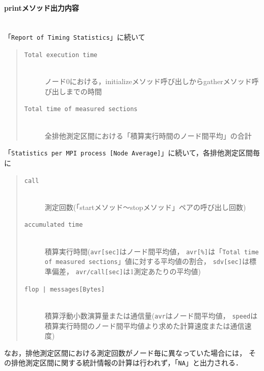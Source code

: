 \paragraph{printメソッド出力内容}\mbox{}\\
「{\tt Report of Timing Statistics}」に続いて
\begin{quote}
\begin{description}
\item[\tt Total execution time]\mbox{}\\
 ノード0における，initializeメソッド呼び出しからgatherメソッド呼び出しまでの時間
\item[\tt Total time of measured sections]\mbox{}\\
 全排他測定区間における「積算実行時間のノード間平均」の合計
\end{description}
\end{quote}
「{\tt Statistics per MPI process [Node Average]}」に続いて，各排他測定区間毎に
\begin{quote}
\begin{description}
\item[\tt call]\mbox{}\\
 測定回数(「startメソッド〜stopメソッド」ペアの呼び出し回数)
\item[\tt accumulated time]\mbox{}\\
 積算実行時間({\tt avr[sec]}はノード間平均値，
{\tt avr[\%]}は「{\tt Total time of measured sections}」値に対する平均値の割合，
{\tt sdv[sec]}は標準偏差，
{\tt avr/call[sec]}は1測定あたりの平均値)
\item[{\tt flop | messages[Bytes]}]\mbox{}\\
積算浮動小数演算量または通信量({\tt avr}はノード間平均値，
{\tt speed}は積算実行時間のノード間平均値より求めた計算速度または通信速度)
\end{description}
\end{quote}

なお，排他測定区間における測定回数がノード毎に異なっていた場合には，
その排他測定区間に関する統計情報の計算は行われず，「{\tt NA}」と出力される．

